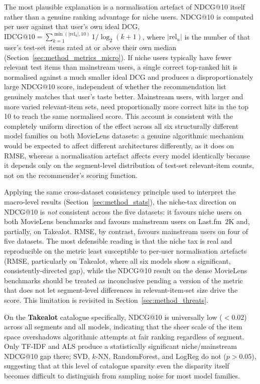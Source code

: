 \documentclass[11pt,a4paper]{report}
\begin{document}
The most plausible explanation is a normalisation artefact of NDCG@10 itself rather than a genuine ranking advantage for niche users. NDCG@10 is computed per user against that user's own ideal DCG, $\mathrm{IDCG}@10 = \sum_{k=1}^{\min(|\mathrm{rel}_u|,10)} 1/\log_2(k+1)$, where $|\mathrm{rel}_u|$ is the number of that user's test-set items rated at or above their own median (Section~\ref{sec:method_metrics_micro}). If niche users typically have fewer relevant test items than mainstream users, a single correct top-ranked hit is normalised against a much smaller ideal DCG and produces a disproportionately large NDCG@10 score, independent of whether the recommendation list genuinely matches that user's taste better. Mainstream users, with larger and more varied relevant-item sets, need proportionally more correct hits in the top 10 to reach the same normalised score. This account is consistent with the completely uniform direction of the effect across all six structurally different model families on both MovieLens datasets: a genuine algorithmic mechanism would be expected to affect different architectures differently, as it does on RMSE, whereas a normalisation artefact affects every model identically because it depends only on the segment-level distribution of test-set relevant-item counts, not on the recommender's scoring function.

Applying the same cross-dataset consistency principle used to interpret the macro-level results (Section~\ref{sec:method_stats}), the niche-tax direction on NDCG@10 is \emph{not} consistent across the five datasets: it favours niche users on both MovieLens benchmarks and favours mainstream users on Last.fm~2K and, partially, on Takealot. RMSE, by contrast, favours mainstream users on four of five datasets. The most defensible reading is that the niche tax is real and reproducible on the metric least susceptible to per-user normalisation artefacts (RMSE, particularly on Takealot, where all six models show a significant, consistently-directed gap), while the NDCG@10 result on the dense MovieLens benchmarks should be treated as inconclusive pending a version of the metric that does not let segment-level differences in relevant-item-set size drive the score. This limitation is revisited in Section~\ref{sec:method_threats}.

On the \textbf{Takealot} catalogue specifically, NDCG@10 is universally low ($< 0.02$) across all segments and all models, indicating that the sheer scale of the item space overshadows algorithmic attempts at fair ranking regardless of segment. Only TF-IDF and ALS produce a statistically significant niche/mainstream NDCG@10 gap there; SVD, $k$-NN, RandomForest, and LogReg do not ($p > 0.05$), suggesting that at this level of catalogue sparsity even the disparity itself becomes difficult to distinguish from sampling noise for most model families.
\end{document}
